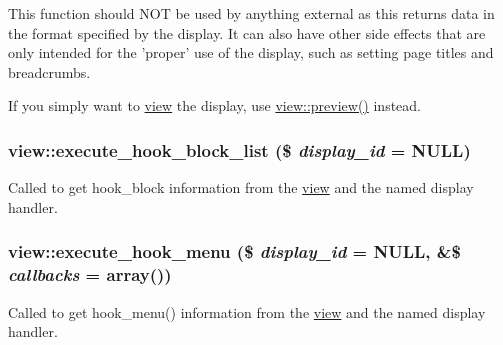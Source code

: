 This function should NOT be used by anything external as this returns data in the format specified by the display. It can also have other side effects that are only intended for the 'proper' use of the display, such as setting page titles and breadcrumbs.

If you simply want to \hyperlink{classview}{view} the display, use \hyperlink{classview_ae279461b2f1636e802587901acdf3bd2}{view::preview()} instead. \hypertarget{classview_a0eea3903963084753464702a9c399406}{
\subsubsection[{execute\_\-hook\_\-block\_\-list}]{\setlength{\rightskip}{0pt plus 5cm}view::execute\_\-hook\_\-block\_\-list (\$ {\em display\_\-id} = {\ttfamily NULL})}}
\label{classview_a0eea3903963084753464702a9c399406}
Called to get hook\_\-block information from the \hyperlink{classview}{view} and the named display handler. \hypertarget{classview_a2e63acdea758605cdb1ce0a8db979ee2}{
\subsubsection[{execute\_\-hook\_\-menu}]{\setlength{\rightskip}{0pt plus 5cm}view::execute\_\-hook\_\-menu (\$ {\em display\_\-id} = {\ttfamily NULL}, \/  \&\$ {\em callbacks} = {\ttfamily array()})}}
\label{classview_a2e63acdea758605cdb1ce0a8db979ee2}
Called to get hook\_\-menu() information from the \hyperlink{classview}{view} and the named display handler.


